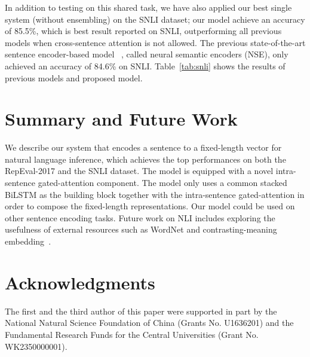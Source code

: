 \documentclass[11pt,letterpaper]{article}
\begin{document}
In addition to testing on this shared task, we have also applied our best single system (without ensembling) on the SNLI dataset; our model achieve an accuracy of 85.5\%, which is best result reported on SNLI, outperforming all previous models when cross-sentence attention is not allowed. The previous state-of-the-art sentence encoder-based model ~\citep{DBLP:journals/corr/MunkhdalaiY16b}, called neural semantic encoders (NSE), only achieved an accuracy of 84.6\% on SNLI. Table~\ref{tab:snli} shows the results of previous models and proposed model. 

\section{Summary and Future Work}

We describe our system that encodes a sentence to a fixed-length vector for natural language inference, which achieves the top performances on both the RepEval-2017 and the SNLI dataset. The model is equipped with a novel intra-sentence gated-attention component. The model only uses a common stacked BiLSTM as the building block together with the intra-sentence gated-attention in order to compose the fixed-length representations. Our model could be used on other sentence encoding tasks. Future work on NLI includes exploring the usefulness of external resources such as WordNet and contrasting-meaning embedding~\citep{Chen:P15-1011}.

\section*{Acknowledgments}
The first and the third author of this paper were supported in part by the National Natural Science Foundation of China (Grants
No. U1636201) and the Fundamental Research Funds for the Central Universities (Grant No. WK2350000001).

\clearpage


\end{document}
